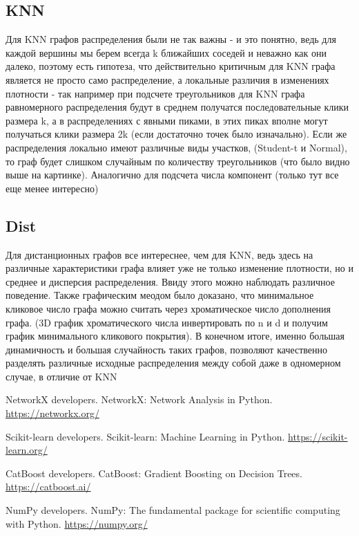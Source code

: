 \documentclass[a4paper,12pt]{report}
\begin{document}
\subsection{KNN}
Для KNN графов распределения были не так важны - и это понятно, ведь для каждой вершины мы берем всегда k ближайших соседей и неважно как они далеко, поэтому есть гипотеза, что действительно критичным для KNN графа является не просто само распределение, а локальные различия в изменениях плотности - так например при подсчете треугольников для KNN графа равномерного распределения будут в среднем получатся последовательные клики размера k, а в распределениях с явными пиками, в этих пиках вполне могут получаться клики размера 2k (если достаточно точек было изначально). Если же распределения локально имеют различные виды участков, (Student-t и Normal), то граф будет слишком случайным по количеству треугольников (что было видно выше на картинке). Аналогично для подсчета числа компонент (только тут все еще менее интересно)

\subsection{Dist}

Для дистанционных графов все интереснее, чем для KNN, ведь здесь на различные характеристики графа влияет уже не только изменение плотности, но и среднее и дисперсия распределения. Ввиду этого можно наблюдать различное поведение. Также графическим меодом было доказано, что минимальное кликовое число графа можно считать через хроматическое число дополнения графа. (3D график хроматического числа инвертировать по n и d и получим график минимального кликового покрытия). 
В конечном итоге, именно большая динамичность и большая случайность таких графов, позволяют качественно разделять различные исходные распределения между собой даже в одномерном случае, в отличие от KNN

\begin{thebibliography}{99}

 NetworkX developers. NetworkX: Network Analysis in Python. \url{https://networkx.org/}

 Scikit-learn developers. Scikit-learn: Machine Learning in Python. \url{https://scikit-learn.org/}

 CatBoost developers. CatBoost: Gradient Boosting on Decision Trees. \url{https://catboost.ai/}

 NumPy developers. NumPy: The fundamental package for scientific computing with Python. \url{https://numpy.org/}

\end{thebibliography}
\end{document}
